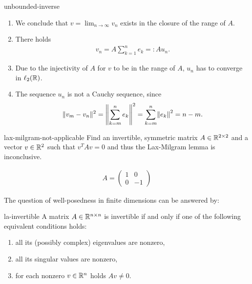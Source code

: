 \begin{Problem}{unbounded-inverse}
\begin{solution}
\begin{enumerate}
\begin{enumerate}
      \item We conclude that $v=\lim_{n\to\infty}v_n$ exists in the
        closure of the range of $A$.
      \item There holds
        \begin{gather*}
          v_n = A \sum_{k=1}^n e_k =: A u_n.
        \end{gather*}
      \item Due to the injectivity of $A$ for $v$ to be in the range of $A$,
            $u_n$ has to converge in $\ell_2(\mathbb R)$.
      \item The sequence $u_n$ is not a Cauchy sequence, since
        \begin{gather*}
          \norm{v_m-v_n}^2 = \norm*{\sum_{k=m}^n e_k}^2
          = \sum_{k=m}^n \norm*{e_k}^2
          = n-m.
        \end{gather*}
    \end{enumerate}
  \end{enumerate}
\end{solution}
\end{Problem}

\begin{Problem}{lax-milgram-not-applicable}
  Find an invertible, symmetric matrix $A\in \mathbb R^{2\times 2}$ and a
  vector $v\in \mathbb R^2$ such that $v^T A v=0$ and thus the Lax-Milgram
  lemma is inconclusive.
\begin{solution}
  \begin{gather*}
    A =
    \begin{pmatrix}
      1 & 0 \\ 0 & -1
    \end{pmatrix}
  \end{gather*}
\end{solution}
\end{Problem}

The question of well-posedness in finite dimensions can be answered by:

\begin{Theorem}{la-invertible}
  A matrix $A\in\mathbb R^{n\times n}$ is invertible if and only if one of
  the following equivalent conditions holds:
  \begin{enumerate}
  \item all its (possibly complex) eigenvalues are nonzero,
  \item all its singular values are nonzero,
  \item for each nonzero $v\in\mathbb R^n$ holds $Av\neq 0$.
  \end{enumerate}
\end{Theorem}

